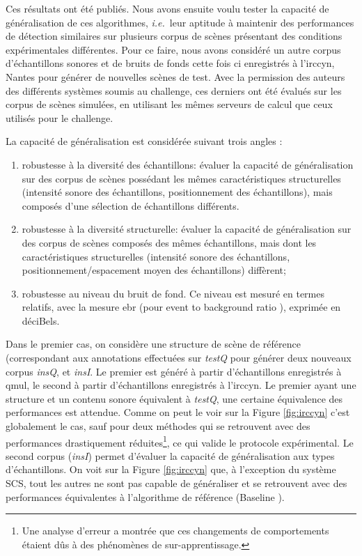   Ces résultats ont été publiés\cite{stowellhal-01253912}. Nous avons ensuite voulu tester la capacité de généralisation de ces algorithmes, \textit{i.e.}~leur aptitude à maintenir des performances de détection similaires sur plusieurs corpus de scènes présentant des conditions expérimentales différentes. Pour ce faire, nous avons considéré un autre corpus d'échantillons sonores et de bruits de fonds  cette fois ci enregistrés à l'irccyn, Nantes pour générer de nouvelles scènes de test. Avec la permission des auteurs des différents systèmes soumis au challenge, ces derniers ont été évalués sur les corpus de scènes simulées, en utilisant les mêmes serveurs de calcul que ceux utilisés pour le challenge.

  La capacité de généralisation est considérée suivant trois angles :
  \begin{enumerate}
  \item robustesse à la diversité des échantillons: évaluer la capacité de généralisation sur des corpus de scènes possédant les mêmes caractéristiques structurelles (intensité sonore des échantillons, positionnement des échantillons), mais composés d'une sélection de échantillons différents.
  \item robustesse à la diversité structurelle: évaluer la capacité de généralisation sur des corpus de scènes composés des mêmes échantillons, mais dont les caractéristiques structurelles (intensité sonore des échantillons, positionnement/espacement moyen des échantillons) diffèrent;
  \item robustesse au niveau du bruit de fond. Ce niveau est mesuré en termes relatifs, avec la mesure ebr (pour \og event to background ratio \fg), exprimée en déciBels.
  \end{enumerate}

  Dans le premier cas, on considère une structure de scène de référence (correspondant aux annotations effectuées sur \emph{testQ} pour générer deux nouveaux corpus \emph{insQ}, et \emph{insI}. Le premier est généré à partir d'échantillons enregistrés à qmul, le second à partir d'échantillons enregistrés à l'irccyn. Le premier ayant une structure et un contenu sonore équivalent à \emph{testQ}, une certaine équivalence des performances est attendue. Comme on peut le voir sur la Figure \ref{fig:irccyn} c'est globalement le cas, sauf pour deux méthodes qui se retrouvent avec des performances drastiquement réduites\footnote{Une analyse d'erreur a montrée que ces changements de comportements étaient dûs à des phénomènes de sur-apprentissage\cite{lafayhal-01111381}.}, ce qui valide le protocole expérimental. Le second corpus (\emph{insI}) permet d'évaluer la capacité de généralisation aux types d'échantillons. On voit sur la Figure \ref{fig:irccyn} que, à l'exception du système SCS, tout les autres ne sont pas capable de généraliser et se retrouvent avec des performances équivalentes à l'algorithme de référence (\og Baseline \fg).

